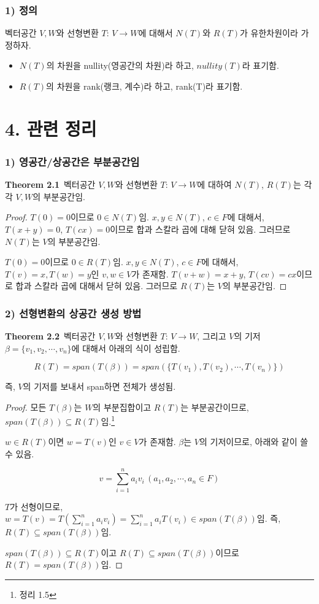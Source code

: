 \subsubsection*{1) 정의\\}
\begin{DEF}
벡터공간 $V,W$와 선형변환 $T:\,V \rightarrow W$에 대해서 $N(T)$와 $R(T)$가 유한차원이라 가정하자.

\begin{itemize}
    \item $N(T)$의 차원을 nullity(영공간의 차원)라 하고, $nullity(T)$라 표기함.
    \item $R(T)$의 차원을 rank(랭크, 계수)라 하고, rank(T)라 표기함.
\end{itemize}
\end{DEF}

\section*{4. 관련 정리}
\subsubsection*{1) 영공간/상공간은 부분공간임}
\textbf{Theorem 2.1}\, 벡터공간 $V, W$와 선형변환 $T:\,V \rightarrow W$에 대하여 $N(T)$, $R(T)$는 각각 $V, W$의 부분공간임.

\begin{proof}
$T(0)=0$이므로 $0 \in N(T)$임. $x,y \in N(T)$, $c \in F$에 대해서, $T(x+y)=0$, $T(cx)=0$이므로 합과 스칼라 곱에 대해 닫혀 있음. 그러므로 $N(T)$는 $V$의 부분공간임.

$T(0)=0$이므로 $0 \in R(T)$임. $x,y \in N(T)$, $c \in F$에 대해서, $T(v)=x, T(w)=y$인 $v,w \in V$가 존재함. $T(v+w)=x+y$, $T(cv)=cx$이므로 합과 스칼라 곱에 대해서 닫혀 있음. 그러므로 $R(T)$는 $V$의 부분공간임.
\end{proof}

\subsubsection*{2) 선형변환의 상공간 생성 방법}
\textbf{Theorem 2.2}\, 벡터공간 $V, W$와 선형변환 $T:\,V \rightarrow W$, 그리고 $V$의 기저 $\beta = \{v_1,v_2, \cdots ,v_n\}$에 대해서 아래의 식이 성립함.

\[
R(T)=span(T(\beta))=span(\{T(v_1),T(v_2), \cdots ,T(v_n)\})
\]

즉, $V$의 기저를 보내서 span하면 전체가 생성됨.

\begin{proof}
모든 $T(\beta)$는 $W$의 부분집합이고 $R(T)$는 부분공간이므로, $span(T(\beta)) \subseteq R(T)임.$\footnote{정리 1.5}

$w \in R(T)$이면 $w=T(v)$인 $v \in V$가 존재함. $\beta$는 $V$의 기저이므로, 아래와 같이 쓸 수 있음.

\[
v= \sum_{i=1}^{n}{a_i v_i}\,(a_1,a_2, \cdots ,a_n \in F)
\]

$T$가 선형이므로, $w=T(v)=T(\sum_{i=1}^{n}{a_i v_i})=\sum_{i=1}^{n}{a_i T(v_i)} \in span(T(\beta))$임. 즉, $R(T) \subseteq span(T(\beta))$임.

$span(T(\beta)) \subseteq R(T)$이고 $R(T) \subseteq span(T(\beta))$이므로 $R(T) = span(T(\beta))$임.
\end{proof}


